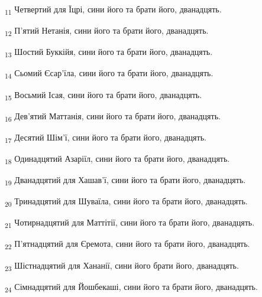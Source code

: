 \begin{tcolorbox}
\textsubscript{11} Четвертий для Їцрі, сини його та брати його, дванадцять.
\end{tcolorbox}
\begin{tcolorbox}
\textsubscript{12} П'ятий Нетанія, сини його та брати його, дванадцять.
\end{tcolorbox}
\begin{tcolorbox}
\textsubscript{13} Шостий Буккійя, сини його та брати його, дванадцять.
\end{tcolorbox}
\begin{tcolorbox}
\textsubscript{14} Сьомий Єсар'їла, сини його та брати його, дванадцять.
\end{tcolorbox}
\begin{tcolorbox}
\textsubscript{15} Восьмий Ісая, сини його та брати його, дванадцять.
\end{tcolorbox}
\begin{tcolorbox}
\textsubscript{16} Дев'ятий Маттанія, сини його та брати його, дванадцять.
\end{tcolorbox}
\begin{tcolorbox}
\textsubscript{17} Десятий Шім'ї, сини його та брати його, дванадцять.
\end{tcolorbox}
\begin{tcolorbox}
\textsubscript{18} Одинадцятий Азаріїл, сини його та брати його, дванадцять.
\end{tcolorbox}
\begin{tcolorbox}
\textsubscript{19} Дванадцятий для Хашав'ї, сини його та брати його, дванадцять.
\end{tcolorbox}
\begin{tcolorbox}
\textsubscript{20} Тринадцятий для Шуваїла, сини його та брати його, дванадцять.
\end{tcolorbox}
\begin{tcolorbox}
\textsubscript{21} Чотирнадцятий для Маттітії, сини його та брати його, дванадцять.
\end{tcolorbox}
\begin{tcolorbox}
\textsubscript{22} П'ятнадцятий для Єремота, сини його та брати його, дванадцять.
\end{tcolorbox}
\begin{tcolorbox}
\textsubscript{23} Шістнадцятий для Хананії, сини його брати його, дванадцять.
\end{tcolorbox}
\begin{tcolorbox}
\textsubscript{24} Сімнадцятий для Йошбекаші, сини його та брати його, дванадцять.
\end{tcolorbox}

